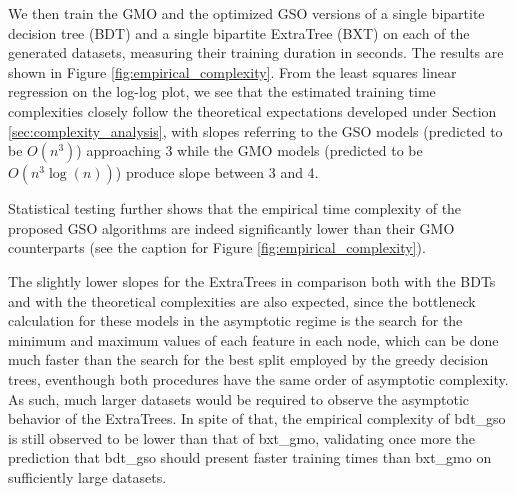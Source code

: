 \documentclass[conference]{IEEEtran}
\begin{document}
We then train the GMO and the optimized GSO versions of a single bipartite decision tree (BDT) and a single bipartite ExtraTree (BXT) on each of the generated datasets, measuring their training duration in seconds. The results are shown in Figure \ref{fig:empirical_complexity}. From the least squares linear regression on the log-log plot, we see that the estimated training time complexities closely follow the theoretical expectations developed under Section \ref{sec:complexity_analysis}, with slopes referring to the GSO models (predicted to be $O(n^3)$) approaching 3 while the GMO models (predicted to be $O(n^3\log(n))$) produce slope between 3 and 4.

Statistical testing further shows that the empirical time complexity of the proposed GSO algorithms are indeed significantly lower than their GMO counterparts (see the caption for Figure \ref{fig:empirical_complexity}).


The slightly lower slopes for the ExtraTrees in comparison both with the BDTs and with the theoretical complexities are also expected, since the bottleneck calculation for these models in the asymptotic regime is the search for the minimum and maximum values of each feature in each node, which can be done much faster than the search for the best split employed by the greedy decision trees, eventhough both procedures have the same order of asymptotic complexity. As such, much larger datasets would be required to observe the asymptotic behavior of the ExtraTrees. In spite of that, the empirical complexity of bdt\_gso is still observed to be lower than that of bxt\_gmo, validating once more the prediction that bdt\_gso should present faster training times than bxt\_gmo on sufficiently large datasets.
\end{document}
